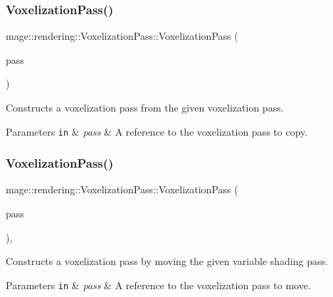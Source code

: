 \subsubsection{\texorpdfstring{Voxelization\+Pass()}{VoxelizationPass()}\hspace{0.1cm}{\footnotesize\ttfamily [2/3]}}
{\footnotesize\ttfamily mage\+::rendering\+::\+Voxelization\+Pass\+::\+Voxelization\+Pass (\begin{DoxyParamCaption}\item[{const \mbox{\hyperlink{classmage_1_1rendering_1_1_voxelization_pass}{Voxelization\+Pass}} \&}]{pass }\end{DoxyParamCaption})\hspace{0.3cm}{\ttfamily [delete]}}

Constructs a voxelization pass from the given voxelization pass.


\begin{DoxyParams}[1]{Parameters}
\mbox{\tt in}  & {\em pass} & A reference to the voxelization pass to copy. \\
\hline
\end{DoxyParams}
\mbox{\label{classmage_1_1rendering_1_1_voxelization_pass_abbdf28fc21b6b4fe4eebf8ed02ac015d}} 
\subsubsection{\texorpdfstring{Voxelization\+Pass()}{VoxelizationPass()}\hspace{0.1cm}{\footnotesize\ttfamily [3/3]}}
{\footnotesize\ttfamily mage\+::rendering\+::\+Voxelization\+Pass\+::\+Voxelization\+Pass (\begin{DoxyParamCaption}\item[{\mbox{\hyperlink{classmage_1_1rendering_1_1_voxelization_pass}{Voxelization\+Pass}} \&\&}]{pass }\end{DoxyParamCaption})\hspace{0.3cm}{\ttfamily [default]}, {\ttfamily [noexcept]}}

Constructs a voxelization pass by moving the given variable shading pass.


\begin{DoxyParams}[1]{Parameters}
\mbox{\tt in}  & {\em pass} & A reference to the voxelization pass to move. \\
\hline
\end{DoxyParams}
\mbox{\label{classmage_1_1rendering_1_1_voxelization_pass_ab989ce6ec60745d7339a1288554dd400}} 
